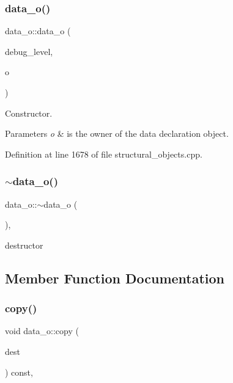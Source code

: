 \subsubsection{\texorpdfstring{data\+\_\+o()}{data\_o()}}
{\footnotesize\ttfamily data\+\_\+o\+::data\+\_\+o (\begin{DoxyParamCaption}\item[{int}]{debug\+\_\+level,  }\item[{const \hyperlink{structural__objects_8hpp_a8ea5f8cc50ab8f4c31e2751074ff60b2}{structural\+\_\+object\+Ref}}]{o }\end{DoxyParamCaption})}



Constructor. 


\begin{DoxyParams}{Parameters}
{\em o} & is the owner of the data declaration object. \\
\hline
\end{DoxyParams}


Definition at line 1678 of file structural\+\_\+objects.\+cpp.

\mbox{\label{classdata__o_ac6f737b19c2d43490ecb499782b9951a}} 
\subsubsection{\texorpdfstring{$\sim$data\+\_\+o()}{~data\_o()}}
{\footnotesize\ttfamily data\+\_\+o\+::$\sim$data\+\_\+o (\begin{DoxyParamCaption}{ }\end{DoxyParamCaption})\hspace{0.3cm}{\ttfamily [override]}, {\ttfamily [default]}}



destructor 



\subsection{Member Function Documentation}
\mbox{\label{classdata__o_a63d272f750a9374710c1bc8a8d06e83c}} 
\subsubsection{\texorpdfstring{copy()}{copy()}}
{\footnotesize\ttfamily void data\+\_\+o\+::copy (\begin{DoxyParamCaption}\item[{\hyperlink{structural__objects_8hpp_a8ea5f8cc50ab8f4c31e2751074ff60b2}{structural\+\_\+object\+Ref}}]{dest }\end{DoxyParamCaption}) const\hspace{0.3cm}{\ttfamily [override]}, {\ttfamily [virtual]}}



